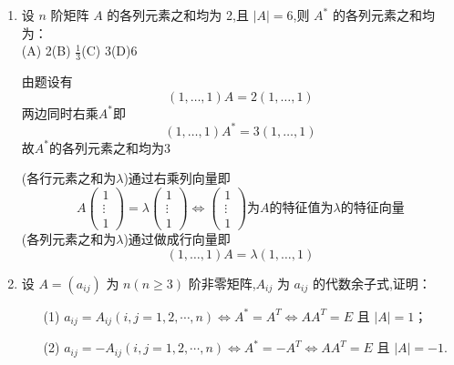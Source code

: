 \documentclass[12pt, a4paper, oneside, UTF8]{ctexbook}
\begin{document}
\begin{enumerate}
    \item 设 $ n $ 阶矩阵 $ A $ 的各列元素之和均为 2,且 $ |A| = 6 $,则 $ A^* $ 的各列元素之和均为：\\
    (A) 2\qquad (B) $\frac{1}{3}$\qquad (C) 3\qquad (D)6
    
    \begin{solution}
    由题设有
    $$
    \left(1,\ldots,1\right)A = 2(1,\ldots, 1)
    $$
    两边同时右乘$A^*$即
    $$
    (1,\ldots,1)A^*=3(1,\ldots,1)
    $$
    故$A^{*}$的各列元素之和均为3
    \end{solution}
    \begin{tcolorbox}[title=各行/列元素之和]
        (各行元素之和为$\lambda$)通过右乘列向量即
        $$
        A\begin{pmatrix}
            1 \\
            \vdots \\
            1
        \end{pmatrix} = \lambda \begin{pmatrix}
            1 \\
            \vdots \\
            1
        \end{pmatrix} \iff \begin{pmatrix}
            1 \\
            \vdots \\
            1
        \end{pmatrix} \text{为}A\text{的特征值为}\lambda\text{的特征向量}
        $$ 
        (各列元素之和为$\lambda$)通过做成行向量即
        $$
        \left(1,\ldots,1\right)A=\lambda\left(1,\ldots,1\right)
        $$
    \end{tcolorbox}
    \item 设 $ A = (a_{ij}) $ 为 $ n(n \geq 3) $ 阶非零矩阵,$ A_{ij} $ 为 $ a_{ij} $ 的代数余子式,证明：
    \begin{enumerate}
        \item[(1)] $ a_{ij} = A_{ij}(i, j = 1, 2, \cdots, n) \Leftrightarrow A^* = A^T \Leftrightarrow AA^T = E $ 且 $ |A| = 1 $；
        \item[(2)] $ a_{ij} = -A_{ij}(i, j = 1, 2, \cdots, n) \Leftrightarrow A^* = -A^T \Leftrightarrow AA^T = E $ 且 $ |A| = -1 $.
    \end{enumerate}
    

\end{enumerate}
\end{document}
